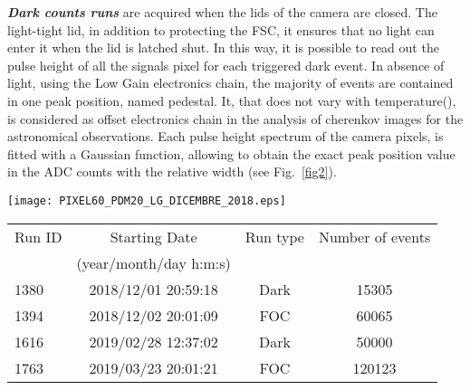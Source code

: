 \textbf{\textit{Dark counts runs}} are acquired
when the lids of the camera are closed.
The light-tight lid, in addition to protecting the FSC, it ensures that no light
can enter it when the lid is latched shut. In this way, it is possible to read out
the pulse height of all the signals pixel for each triggered dark event.
In absence of light, using the Low Gain electronics chain, the majority of events are 
contained in one peak position, named pedestal. 
It, that does not vary with temperature(\cite{Impiombato2016}), is considered as offset electronics chain in the analysis of cherenkov images for the astronomical
observations.
Each pulse height spectrum of the camera pixels, is fitted with a Gaussian function, allowing to obtain the exact peak position value in the ADC counts with the relative width (see Fig.~\ref{fig2}).





\begin{figure*}[h!!]
\centering
\texttt{[image: PIXEL60\_PDM20\_LG\_DICEMBRE\_2018.eps]}
\vspace{0.5cm}
\caption{ Single photo-electron peak spectrum for a camera pixel taken in peak detector mode in one of the Dark run listed in 
Table~\ref{table2}. The black curve represents the distribution of the peak detector
output and the red curve shows the corresponding Gaussian fit.}
\label{fig2}
\end{figure*}
\label{subs:skydata}





\begin{table*}[htbp!!]
\centering
\caption{ASTRI-Horn FOC/Dark runs}
\label{table2}
\begin{tabular}{lccc}
\hline\hline
Run ID & Starting Date & Run type      & Number of events \\
               & (year/month/day h:m:s)   \\
\hline     
1380 & 2018/12/01 20:59:18  &   Dark    & 15305      \\
1394 & 2018/12/02 20:01:09  &   FOC     & 60065     \\
1616 & 2019/02/28 12:37:02  &   Dark    & 50000     \\
1763 & 2019/03/23 20:01:21  &   FOC     & 120123    \\
  

\hline\hline
\end{tabular}
\end{table*}

